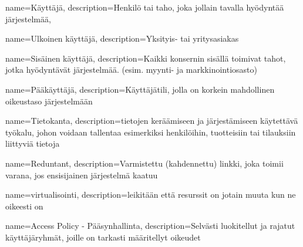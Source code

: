     {
    name={Käyttäjä},
    description={Henkilö tai taho, joka jollain tavalla hyödyntää järjestelmää},
    }

    {
    name={Ulkoinen käyttäjä},
    description={Yksityis- tai yritysasiakas}
    }

    {
    name={Sisäinen käyttäjä},
    description={Kaikki konsernin sisällä toimivat tahot, jotka hyödyntävät järjestelmää. (esim. myynti- ja markkinointiosasto)}
    }

    {
    name={Pääkäyttäjä},
    description={Käyttäjätili, jolla on korkein mahdollinen oikeustaso järjestelmään}
    }

    {
    name={Tietokanta},
    description={tietojen keräämiseen ja järjestämiseen käytettävä työkalu, johon voidaan tallentaa esimerkiksi henkilöihin, tuotteisiin tai tilauksiin liittyviä tietoja}
    }

    {
    name={Reduntant},
    description={Varmistettu (kahdennettu) linkki, joka toimii varana, jos ensisijainen järjestelmä kaatuu}
    }

    {
    name={virtualisointi},
    description={leikitään että resurssit on jotain muuta kun ne oikeesti on}
    }

    {
    name={Access Policy - Pääsynhallinta},
    description={Selvästi luokitellut ja rajatut käyttäjäryhmät, joille on tarkasti määritellyt oikeudet}
    }

        


